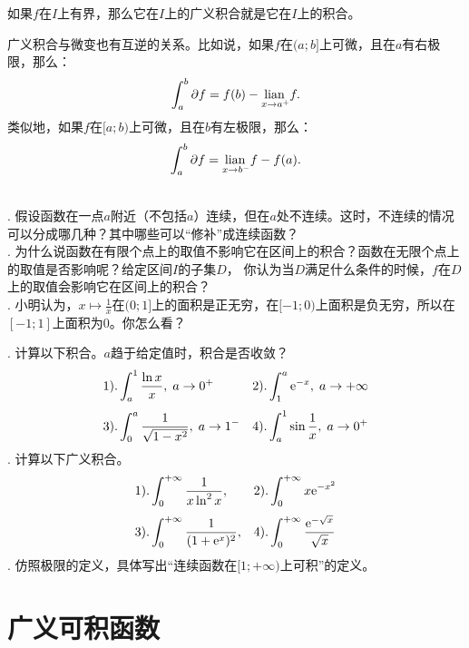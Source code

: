 \documentclass[12pt,UTF8,fontset=none]{ctexbook}
\begin{document}
如果$f$在$I$上有界，那么它在$I$上的广义积合就是它在$I$上的积合。

广义积合与微变也有互逆的关系。比如说，如果$f$在$(a;b]$上可微，且在$a$有右极限，那么：
$$ \int_a^b \partial f = f(b) - \underset{x\to a^+}{\operatorname{lian}\,} f.$$
类似地，如果$f$在$[a;b)$上可微，且在$b$有左极限，那么：
$$ \int_a^b \partial f = \underset{x\to b^-}{\operatorname{lian}\,} f - f(a).$$

\begin{sk}
    \mbox{} \\
    . 假设函数在一点$a$附近（不包括$a$）连续，但在$a$处不连续。这时，不连续的情况可以分成哪几种？其中哪些可以“修补”成连续函数？\\
    . 为什么说函数在有限个点上的取值不影响它在区间上的积合？函数在无限个点上的取值是否影响呢？给定区间$I$的子集$D$，
    你认为当$D$满足什么条件的时候，$f$在$D$上的取值会影响它在区间上的积合？\\
    . 小明认为，$x\mapsto\frac{1}{x}$在$(0;1]$上的面积是正无穷，在$[-1;0)$上面积是负无穷，所以在$[-1;1]$上面积为$0$。你怎么看？
\end{sk}

\begin{xt}
    . 计算以下积合。$a$趋于给定值时，积合是否收敛？\\    
    \begin{align*}
        1).& \int_a^{1} \frac{\ln{x}}{x} , \; a\to 0^+  &2).& \int_1^{a} \mathrm{e}^{-x},  \; a\to +\infty \\[3pt]
        3).& \int_0^{a} \frac{1}{\sqrt{1 - x^2}}, \; a\to 1^-   & 4).& \int_a^{1} \sin{\frac{1}{x}}, \; a\to 0^+ 
    \end{align*}
    . 计算以下广义积合。\\    
    \begin{align*}
        1).& \int_0^{+\infty} \frac{1}{x\ln^2{x}} ,  &2).& \int_0^{+\infty} x\mathrm{e}^{-x^2} \\[3pt]
        3).& \int_0^{+\infty} \frac{1}{(1 + \mathrm{e}^{x})^2},  & 4).& \int_0^{+\infty} \frac{\mathrm{e}^{-\sqrt{x}}}{\sqrt{x}}
    \end{align*}
    . 仿照极限的定义，具体写出“连续函数在$[1;+\infty)$上可积”的定义。\\

\end{xt}

\section{广义可积函数}
\end{document}
